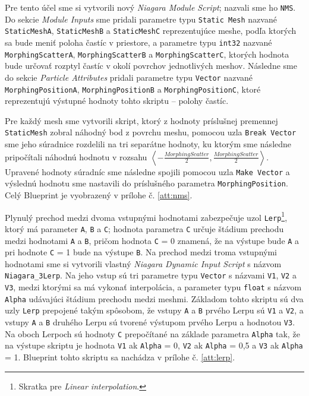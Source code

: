 Pre tento účel sme si vytvorili nový \emph{Niagara Module Script}; nazvali sme ho \texttt{NMS}. Do sekcie \emph{Module Inputs} sme pridali parametre typu \texttt{Static Mesh} nazvané \texttt{StaticMeshA}, \texttt{StaticMeshB} a 
\texttt{StaticMeshC} reprezentujúce meshe, podľa ktorých sa bude meniť poloha častíc v priestore, a parametre typu \texttt{int32} nazvané \texttt{MorphingScatterA}, \texttt{MorphingScatterB} a \texttt{MorphingScatterC},
ktorých hodnota bude určovať rozptyl častíc v okolí povrchov jednotlivých meshov. Následne sme do sekcie \emph{Particle Attributes} pridali parametre typu \texttt{Vector} nazvané \texttt{MorphingPositionA}, 
\texttt{MorphingPositionB} a \texttt{MorphingPositionC}, ktoré reprezentujú výstupné hodnoty tohto skriptu {--} polohy častíc.

Pre každý mesh sme vytvorili skript, ktorý z hodnoty príslušnej premennej \texttt{StaticMesh} zobral náhodný bod z povrchu meshu, pomocou uzla \texttt{Break Vector} sme jeho súradnice rozdelili na tri 
separátne hodnoty, ku ktorým sme následne pripočítali náhodnú hodnotu v rozsahu \(\left<-\frac{MorphingScatter}{2}, \frac{MorphingScatter}{2}\right>\). Upravené hodnoty súradníc sme následne spojili pomocou uzla 
\texttt{Make Vector} a výslednú hodnotu sme nastavili do príslušného parametra \texttt{MorphingPosition}. Celý Blueprint je vyobrazený v prílohe č. \ref{att:nms}.

Plynulý prechod medzi dvoma vstupnými hodnotami zabezpečuje uzol \texttt{Lerp}\footnote{Skratka pre \emph{Linear interpolation}.}, ktorý má parameter \texttt{A}, \texttt{B} a \texttt{C};
hodnota parametra \texttt{C} určuje štádium prechodu medzi hodnotami \texttt{A} a \texttt{B}, pričom hodnota \texttt{C} = 0 znamená, že na výstupe bude \texttt{A} a pri hodnote \texttt{C} = 1 bude na výstupe \texttt{B}.
Na prechod medzi troma vstupnými hodnotami sme si vytvorili vlastný \emph{Niagara Dynamic Input Script} s názvom \texttt{Niagara\_3Lerp}. Na jeho vstup sú tri parametre typu \texttt{Vector} s názvami \texttt{V1}, 
\texttt{V2} a \texttt{V3}, medzi ktorými sa má vykonať interpolácia, a parameter typu \texttt{float} s názvom \texttt{Alpha} udávajúci štádium prechodu medzi meshmi. Základom tohto skriptu sú dva uzly \texttt{Lerp} 
prepojené takým spôsobom, že vstupy \texttt{A} a \texttt{B} prvého Lerpu sú \texttt{V1} a \texttt{V2}, a vstupy \texttt{A} a \texttt{B} druhého Lerpu sú tvorené výstupom prvého Lerpu a hodnotou \texttt{V3}.
Na oboch Lerpoch sú hodnoty \texttt{C} prepočítané na základe parametra \texttt{Alpha} tak, že na výstupe skriptu je hodnota \texttt{V1} ak \texttt{Alpha} = 0, \texttt{V2} ak \texttt{Alpha} = 0,5 a \texttt{V3} 
ak \texttt{Alpha} = 1. Blueprint tohto skriptu sa nachádza v prílohe č. \ref{att:lerp}.

